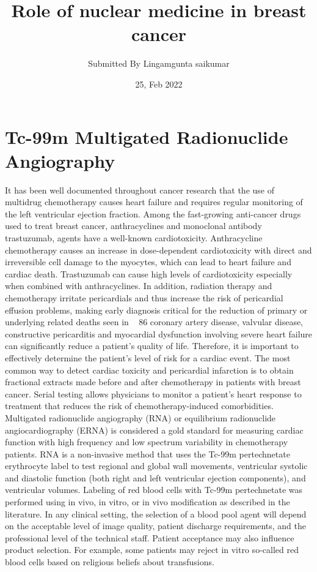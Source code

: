 \documentclass{article}
\title{Role of nuclear medicine in breast cancer}
\author{Submitted By Lingamgunta saikumar}
\date{25, Feb 2022}
\begin{document}
\maketitle

\section{Tc-99m Multigated Radionuclide Angiography}
It has been well documented throughout cancer research that the use of multidrug 
chemotherapy causes heart failure and requires regular monitoring of the left ventricular 
ejection fraction. Among the fast-growing anti-cancer drugs used to treat breast cancer, 
anthracyclines and monoclonal antibody trastuzumab, agents have a well-known 
cardiotoxicity. Anthracycline chemotherapy causes an increase in dose-dependent 
cardiotoxicity with direct and irreversible cell damage to the myocytes, which can lead to 
heart failure and cardiac death. Trastuzumab can cause high levels of cardiotoxicity 
especially when combined with anthracyclines. In addition, radiation therapy and 
chemotherapy irritate pericardials and thus increase the risk of pericardial effusion 
problems, making early diagnosis critical for the reduction of primary or underlying related 
deaths seen in ~ 86%
coronary artery disease, valvular disease, constructive pericarditis and myocardial 
dysfunction involving severe heart failure can significantly reduce a patient's quality of life. 
Therefore, it is important to effectively determine the patient's level of risk for a cardiac 
event. The most common way to detect cardiac toxicity and pericardial infarction is to 
obtain fractional extracts made before and after chemotherapy in patients with breast 
cancer. Serial testing allows physicians to monitor a patient's heart response to treatment 
that reduces the risk of chemotherapy-induced comorbidities.
Multigated radionuclide angiography (RNA) or equilibrium radionuclide angiocardiography 
(ERNA) is considered a gold standard for measuring cardiac function with high frequency 
and low spectrum variability in chemotherapy patients. RNA is a non-invasive method that 
uses the Tc-99m pertechnetate erythrocyte label to test regional and global wall 
movements, ventricular systolic and diastolic function (both right and left ventricular 
ejection components), and ventricular volumes. Labeling of red blood cells with Tc-99m 
pertechnetate was performed using in vivo, in vitro, or in vivo modification as described in 
the literature. In any clinical setting, the selection of a blood pool agent will depend on the 
acceptable level of image quality, patient discharge requirements, and the professional level 
of the technical staff. Patient acceptance may also influence product selection. For example, 
some patients may reject in vitro so-called red blood cells based on religious beliefs about 
transfusions.
\end{document}
